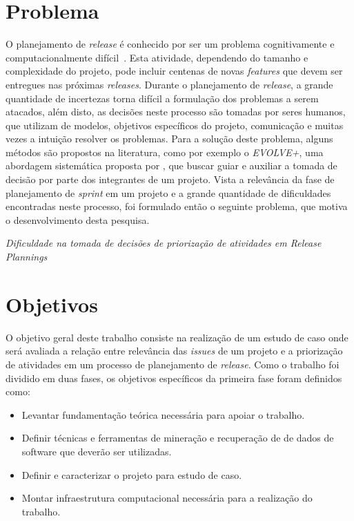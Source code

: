 \section{Problema}
\label{int:pro}
O planejamento de \textit{release} é conhecido por ser um problema cognitivamente e computacionalmente difícil~\cite{Ngo}. Esta atividade, dependendo do tamanho e complexidade do projeto, pode incluir centenas de novas \textit{features} que devem ser entregues nas próximas \textit{releases}. Durante o planejamento de \textit{release}, a grande quantidade de incertezas torna difícil a formulação dos problemas a serem atacados, além disto, as decisões neste processo são tomadas por seres humanos, que utilizam de modelos, objetivos específicos do projeto, comunicação e muitas vezes a intuição resolver os problemas. Para a solução deste problema, alguns métodos são propostos na literatura, como por exemplo o \textit{EVOLVE+}, uma abordagem sistemática proposta por \cite{Ngo}, que buscar guiar e auxiliar a tomada de decisão por parte dos integrantes de um projeto. Vista a relevância da fase de planejamento de \textit{sprint} em um projeto e a grande quantidade de dificuldades encontradas neste processo, foi formulado então  o seguinte problema, que motiva o desenvolvimento desta pesquisa.

\begin{center}
 \textit{Dificuldade na tomada de decisões de priorização de atividades em \textit{Release Plannings}}
\end{center}

\section{Objetivos}
\label{int:obj}

O objetivo geral deste trabalho consiste na realização de um estudo de caso onde será avaliada a relação entre relevância das \textit{issues} de um projeto e a priorização de atividades em um processo de planejamento de \textit{release}. Como o trabalho foi dividido em duas fases, os objetivos específicos da primeira fase foram definidos como:

\begin{itemize}
    \item Levantar fundamentação teórica necessária para apoiar o trabalho.
    \item Definir técnicas e ferramentas de mineração e recuperação de de dados de software que deverão ser utilizadas.
    \item Definir e caracterizar o projeto para estudo de caso.
    \item Montar infraestrutura computacional necessária para a realização do trabalho.
\end{itemize}

